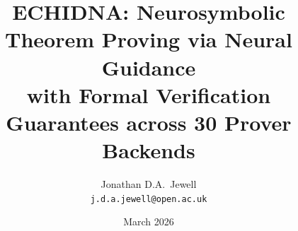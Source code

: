 \documentclass[11pt,a4paper]{article}
\begin{document}
\title{%
  \textsc{ECHIDNA}: Neurosymbolic Theorem Proving via Neural Guidance \\
  with Formal Verification Guarantees across 30 Prover Backends%
}

\author{
  Jonathan D.A.\ Jewell \\
  \texttt{j.d.a.jewell@open.ac.uk}
}

\date{March 2026}

\maketitle

\end{document}
